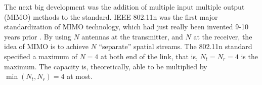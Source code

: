 The next big development was the addition of multiple input multiple output (MIMO) methods to the standard.  IEEE 802.11n was the first major standardization of MIMO technology, which had just really been invented 9-10 years prior \cite{alamouti1998simple}.  By using $N$ antennas at the transmitter, and $N$ at the receiver, the idea of MIMO is to achieve $N$ ``separate'' spatial streams.  The 802.11n standard specified a maximum of $N=4$ at both end of the link, that is, $N_t = N_r = 4$ is the maximum.  The capacity is, theoretically, able to be multiplied by $\min (N_t, N_r) = 4$ at most.


